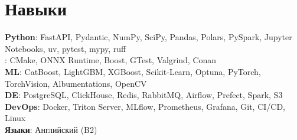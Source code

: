 \providecommand{\skillsPython}{\textbf{Python}{: FastAPI, Pydantic, NumPy, SciPy, Pandas, Polars, PySpark, Jupyter Notebooks, uv, pytest, mypy, ruff}}
\providecommand{\skillsCpp}{\textbf{\cpp}{: CMake, ONNX Runtime, Boost, GTest, Valgrind, Conan}}
\providecommand{\skillsML}{\textbf{ML}{: CatBoost, LightGBM, XGBoost, Scikit-Learn, Optuna, PyTorch, TorchVision, Albumentations, OpenCV}}
\providecommand{\skillsData}{\textbf{DE}{: PostgreSQL, ClickHouse, Redis, RabbitMQ, Airflow, Prefect, Spark, S3}}
\providecommand{\skillsDevOps}{\textbf{DevOps}{: Docker, Triton Server, MLflow, Prometheus, Grafana, Git, CI/CD, Linux}}
\providecommand{\skillsLanguages}{\textbf{Языки}{: Английский (B2)}}

\section{Навыки}
\begin{itemize}[leftmargin=0.15in, label={}]
	\small{
	\item{
	      \skillsPython \\
	      \skillsCpp \\
	      \skillsML \\
	      \skillsData \\
	      \skillsDevOps \\
	      \skillsLanguages
	      }}
\end{itemize}
